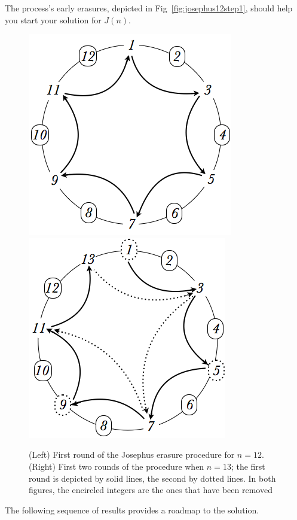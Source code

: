 \begin{enumerate}
The process's early erasures, depicted in Fig~\ref{fig:josephus12step1}, should help you start your solution for $J(n)$.
\begin{figure}[ht]
\begin{center}
        \includegraphics[scale=0.35]{FiguresMaths/josephus12step1}
        \hspace*{.2in}
        \includegraphics[scale=0.35]{FiguresMaths/josephus13}
\caption{(Left) First round of the Josephus erasure procedure for $n=12$.
(Right) First two rounds of the procedure when $n=13$; the first round is depicted by solid lines, the second by dotted lines. In both figures, the encircled integers are the ones that have been removed}
        \label{fig:josephus12step1}  \label{fig:josephus13}
\end{center}
\end{figure}

The following sequence of results provides a roadmap to the solution.


\end{enumerate}
